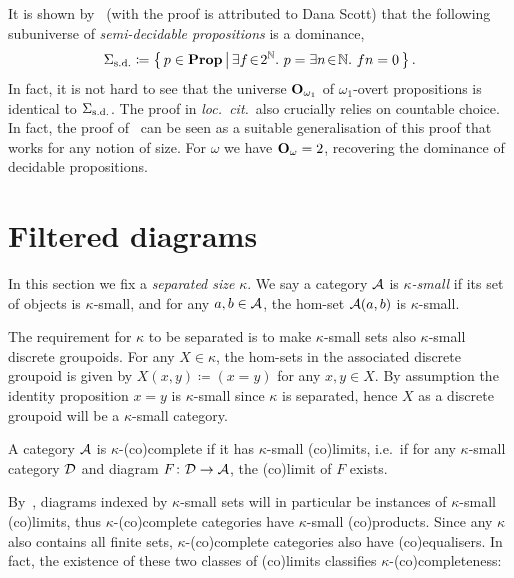 \begin{remark}\label{rem:dominanceofsemidecidable}
  It is shown by~\citet[Prop. 5.2.1]{rosolini1986continuity} (with the proof is attributed to Dana Scott) that the following subuniverse of \emph{semi-decidable propositions} is a dominance,
  \[ \Sigma_{\mathrm{s.d.}} \coloneq \left\{\,p\in\mathbf{Prop}\,\middle|\,\exists f\!\in\!2^{\mathbb{N}}.\  p = \exists n\!\in\!\mathbb{N}.\ fn = 0\,\right\}. \]
  In fact, it is not hard to see that the universe $\mathbf{O}_{\omega_1}$ of $\omega_1$-overt propositions is identical to $\Sigma_{\mathrm{s.d.}}$. The proof in \emph{loc.\ cit.}\ also crucially relies on countable choice. In fact, the proof of~ can be seen as a suitable generalisation of this proof that works for any notion of size. For $\omega$ we have $\mathbf{O}_\omega = 2$, recovering the dominance of decidable propositions.
\end{remark}

\section{Filtered diagrams}

In this section we fix a \emph{separated size} $\kappa$. We say a category $\mathcal{A}$ is \emph{$\kappa$-small} if its set of objects is $\kappa$-small, and for any $a,b \in \mathcal{A}$, the hom-set $\mathcal{A}(a,b)$ is $\kappa$-small. 

\begin{example}\label{exa:discgroupoidkappasmall}
  The requirement for $\kappa$ to be separated is to make $\kappa$-small sets also $\kappa$-small discrete groupoids. For any $X\in\kappa$, the hom-sets in the associated discrete groupoid is given by $X(x,y) \coloneq (x = y)$ for any $x,y\in X$. By assumption the identity proposition $x = y$ is $\kappa$-small since $\kappa$ is separated, hence $X$ as a discrete groupoid will be a $\kappa$-small category.
\end{example}

\begin{definition}
  A category $\mathcal{A}$ is $\kappa$-(co)complete if it has $\kappa$-small (co)limits, i.e.\ if for any $\kappa$-small category $\mathcal{D}$ and diagram $F \colon \mathcal{D} \to \mathcal{A}$, the (co)limit of $F$ exists.
\end{definition}

By~, diagrams indexed by $\kappa$-small sets will in particular be instances of $\kappa$-small (co)limits, thus $\kappa$-(co)complete categories have $\kappa$-small (co)products. Since any $\kappa$ also contains all finite sets, $\kappa$-(co)complete categories also have (co)equalisers. In fact, the existence of these two classes of (co)limits classifies $\kappa$-(co)completeness:

